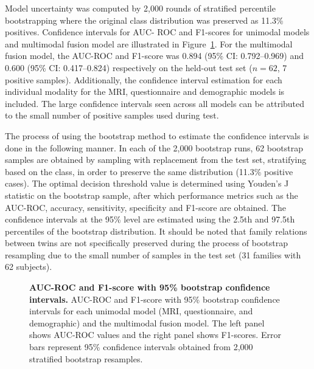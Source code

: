 \documentclass[10pt,letterpaper]{article}
\begin{document}
                                                                                                                          Model uncertainty was computed by 2,000 rounds of stratified percentile bootstrapping where
the original class distribution was preserved as 11.3\% positives. Confidence intervals for AUC-
ROC and F1-scores for unimodal models and multimodal fusion model are illustrated in
Figure~\ref{fig:ci_barplot}. For the multimodal fusion model, the AUC-ROC and F1-score was
0.894 (95\% CI: 0.792--0.969) and 0.600 (95\% CI: 0.417--0.824) respectively on the held-out
test set ($n = 62$, 7 positive samples). Additionally, the confidence interval estimation for each
individual modality for the MRI, questionnaire and demographic models is included. The large
confidence intervals seen across all models can be attributed to the small number of positive
samples used during test.

                                                                                                                          The process of using the bootstrap method to estimate the confidence intervals is done in the
following manner. In each of the 2,000 bootstrap runs, 62 bootstrap samples are obtained by
sampling with replacement from the test set, stratifying based on the class, in order to preserve
the same distribution (11.3\% positive cases). The optimal decision threshold value is
determined using Youden's J statistic on the bootstrap sample, after which performance
metrics such as the AUC-ROC, accuracy, sensitivity, specificity and F1-score are obtained. The
confidence intervals at the 95\% level are estimated using the 2.5th and 97.5th percentiles of
the bootstrap distribution. It should be noted that family relations between twins are not
specifically preserved during the process of bootstrap resampling due to the small number of
samples in the test set (31 families with 62 subjects).

                                                                                                                          \begin{figure}[!ht]
                                                                                                                          \caption{\textbf{AUC-ROC and F1-score with 95\% bootstrap confidence intervals.}
                                                                                                                          AUC-ROC and F1-score with 95\% bootstrap confidence intervals for each unimodal model (MRI, questionnaire, and demographic) and the multimodal fusion model. The left panel shows AUC-ROC values and the right panel shows F1-scores. Error bars represent 95\% confidence intervals obtained from 2,000 stratified bootstrap resamples.}
                                                                                                                          \label{fig:ci_barplot}
                                                                                                                          \end{figure}
\end{document}
